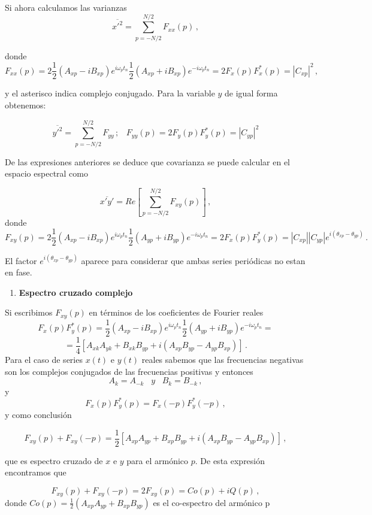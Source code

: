 \documentclass[
]{agujournal2019}
\providecommand{\tightlist}{%
  \setlength{\itemsep}{0pt}\setlength{\parskip}{0pt}}\usepackage{longtable,booktabs,array}
\begin{document}
Si ahora calculamos las varianzas
\[\overline{x'^2}=\sum\limits^{N/2}_{p=-N/2}F_{xx}(p)\,,\]

donde
\[F_{xx}(p)=2\frac{1}{2}\left(A_{xp} - iB_{xp} \right)e^{i\omega_p t_n}\frac{1}{2}\left(A_{xp} + iB_{xp} \right)e^{-i\omega_p t_n}
=2F_x(p) F^*_x(p)=|C_{xp}|^2\,,\]

y el asterisco indica complejo conjugado. Para la variable \(y\) de
igual forma obtenemos:

\[\overline{y'^2}=\sum\limits^{N/2}_{p=-N/2}F_{yy}\,;\,\,\,\,\,F_{yy}(p)=2F_y(p) F^*_y(p)=|C_{yp}|^2\]

De las expresiones anteriores se deduce que covarianza se puede calcular
en el espacio espectral como

\[\overline{x'y'}=Re\left[\sum\limits^{N/2}_{p=-N/2}F_{xy}(p)\right]\,,\]
donde
\[F_{xy}(p)=2\frac{1}{2}\left(A_{xp} - iB_{xp} \right)e^{i\omega_p t_n}\frac{1}{2}\left(A_{yp} + iB_{yp} \right)e^{-i\omega_p t_n}
=2F_x(p) F^*_y(p)=|C_{xp}||C_{yp}|e^{i(\theta_{xp}-\theta_{yp})}\,.\]

El factor \(e^{i(\theta_{xp}-\theta_{yp})}\) aparece para considerar que
ambas series periódicas no estan en fase.

\vspace{0.5cm}

\begin{enumerate}
\def\labelenumi{(\arabic{enumi})}
\setcounter{enumi}{3}
\tightlist
\item
  \textbf{Espectro cruzado complejo}
\end{enumerate}

Si escribimos \(F_{xy}(p)\) en términos de los coeficientes de Fourier
reales
\[F_x(p) F^*_y(p)=\frac{1}{2}\left(A_{xp} - iB_{xp} \right)e^{i\omega_p t_n}\frac{1}{2}\left(A_{yp} + iB_{yp} \right)e^{-i\omega_p t_n}=\]
\[=\frac{1}{4}\left[A_{xk}A_{yk}  + B_{xk}B_{yp} + i\left(A_{xp}B_{yp} - A_{yp}B_{xp}\right)\right]\,.\]
Para el caso de series \(x(t)\) e \(y(t)\) reales sabemos que las
frecuencias negativas son los complejos conjugados de las frecuencias
positivas y entonces \[A_k=A_{-k}\,\,\,\,\,{ y}\,\,\,\,\,B_k=B_{-k}\,,\]
y \[F_x(p)F^*_y(p)=F_x(-p)F_y^*(-p)\,,\] y como conclusión

\[F_{xy}(p)+F_{xy}(-p)=\frac{1}{2}\left[ A_{xp}A_{yp}  + B_{xp}B_{yp} + i\left(A_{xp}B_{yp} - A_{yp}B_{xp}\right)\right]\,,\]

que es espectro cruzado de \(x\) e \(y\) para el armónico \(p\). De esta
expresión encontramos que

\[F_{xy}(p)+F_{xy}(-p)=2F_{xy}(p)=Co(p) + i Q(p)\,,\] donde
\(Co(p)=\frac{1}{2}( A_{xp}A_{yp} + B_{xp}B_{yp})\) es el co-espectro
del armónico p
\end{document}
